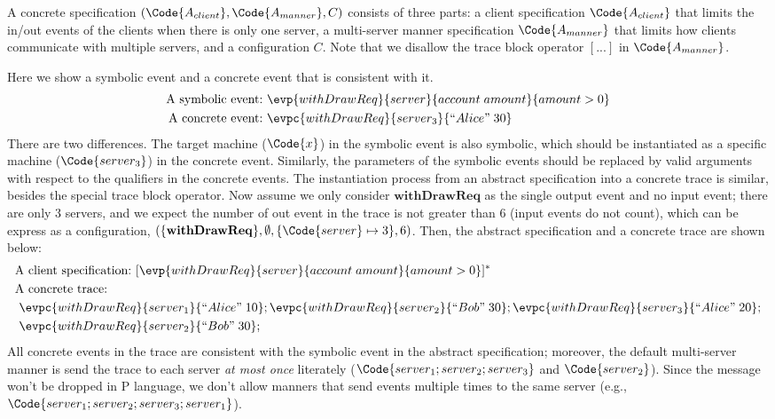 A concrete specification $(\Code{A_{client}}, \Code{A_{manner}}, C)$ consists of three parts: a client specification $\Code{A_{client}}$ that limits the in/out events of the clients when there is only one server, a multi-server manner specification $\Code{A_{manner}}$ that limits how clients communicate with multiple servers, and a configuration $C$. Note that we disallow the trace block operator $[...]$ in $\Code{A_{manner}}$.

\begin{example} Here we show a symbolic event and a concrete event that is consistent with it.
\begin{align*}
    \text{A symbolic event:}&\ \evp{withDrawReq}{server}{account\; amount}{amount > 0}
    \\\text{A concrete event:}&\ \evpc{withDrawReq}{server_3}{``Alice"\; 30}
\end{align*}\noindent
There are two differences. The target machine ($\Code{x}$) in the symbolic event is also symbolic, which should be instantiated as a specific machine ($\Code{server_3}$) in the concrete event. Similarly, the parameters of the symbolic events should be replaced by valid arguments with respect to the qualifiers in the concrete events. The instantiation process from an abstract specification into a concrete trace is similar, besides the special trace block operator. 
Now assume we only consider $\mathbf{withDrawReq}$ as the single output event and no input event; there are only $3$ servers, and we expect the number of out event in the trace is not greater than $6$ (input events do not count), which can be express as a configuration, $(\{\mathbf{withDrawReq}\}, \emptyset, \{\Code{server}\mapsto3\}, 6)$. Then, the abstract specification and a concrete trace are shown below:
{\small
\begin{align*}
    &\text{A client specification:}\ [\evp{withDrawReq}{server}{account\; amount}{amount > 0}]^*
    \\&\text{A concrete trace:}\ 
    \\ &\ \evpc{withDrawReq}{server_1}{``Alice"\; 10};\evpc{withDrawReq}{server_2}{``Bob"\; 30};\evpc{withDrawReq}{server_3}{``Alice"\; 20};
    \\ &\ \evpc{withDrawReq}{server_2}{``Bob"\; 30};
\end{align*}}\noindent
All concrete events in the trace are consistent with the symbolic event in the abstract specification; moreover, the default multi-server manner is send the trace to each server \emph{at most once} literately ($\Code{server_1;server_2;server_3}$ and $\Code{server_2}$). Since the message won't be dropped in P language, we don't allow manners that send events multiple times to the same server (e.g., $\Code{server_1;server_2;server_3;server_1}$).


\end{example}
